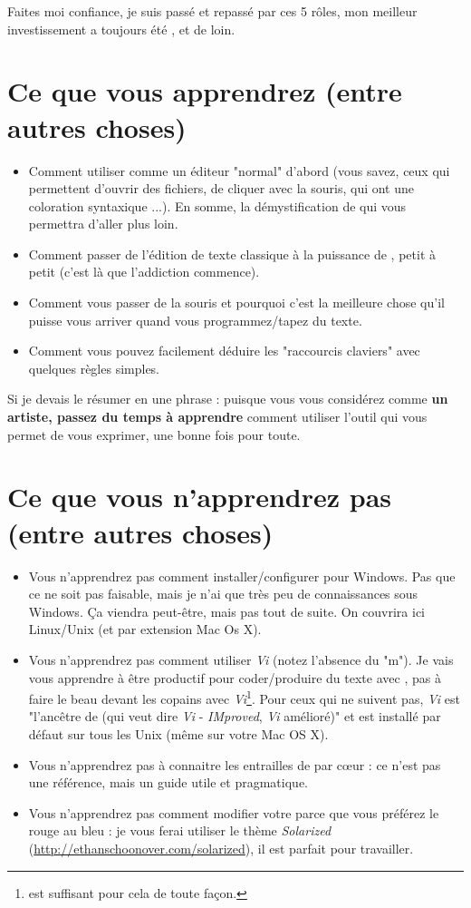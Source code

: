 Faites moi confiance, je suis passé et repassé par ces 5 rôles, mon meilleur investissement a toujours été \vim, et de loin.

\section{Ce que vous apprendrez (entre autres choses)}

\begin{itemize}
    \item Comment utiliser \vim comme un éditeur "normal" d'abord (vous savez, ceux qui permettent d'ouvrir des fichiers, de cliquer avec la souris, qui ont une coloration syntaxique ...). En somme, la démystification de \vim qui vous permettra d'aller plus loin.
    \item Comment passer de l'édition de texte classique à la puissance de \vim, petit à petit (c'est là que l'addiction commence).
    \item Comment vous passer de la souris et pourquoi c'est la meilleure chose qu'il puisse vous arriver quand vous programmez/tapez du texte.
    \item Comment vous pouvez facilement déduire les "raccourcis claviers" avec quelques règles simples.
\end{itemize}

Si je devais le résumer en une phrase : puisque vous vous considérez comme {\bf un artiste, passez du temps à apprendre} comment utiliser l'outil qui vous permet de vous exprimer, une bonne fois pour toute.

\section{Ce que vous n'apprendrez pas (entre autres choses)}

\begin{itemize}
    \item Vous n'apprendrez pas comment installer/configurer \vim pour Windows. Pas que ce ne soit pas faisable, mais je n'ai que très peu de connaissances sous Windows. Ça viendra peut-être, mais pas tout de suite. On couvrira ici Linux/Unix (et par extension Mac Os X).
    \item Vous n'apprendrez pas comment utiliser \emph{Vi} (notez l'absence du "m"). Je vais vous apprendre à être productif pour coder/produire du texte avec \vim, pas à faire le beau devant les copains avec \emph{Vi}\footnote{\vim est suffisant pour cela de toute façon.}. Pour ceux qui ne suivent pas, \emph{Vi} est "l'ancêtre de \vim (qui veut dire \emph{Vi} - \emph{IMproved}, \emph{Vi} amélioré)" et est installé par défaut sur tous les Unix (même sur votre Mac OS X).
    \item Vous n'apprendrez pas à connaitre les entrailles de \vim par c\oe ur : ce n'est pas une référence, mais un guide utile et pragmatique.
    \item Vous n'apprendrez pas comment modifier votre \vim parce que vous préférez le rouge au bleu : je vous ferai utiliser le thème \emph{Solarized} (\url{http://ethanschoonover.com/solarized}), il est parfait pour travailler.
\end{itemize}

